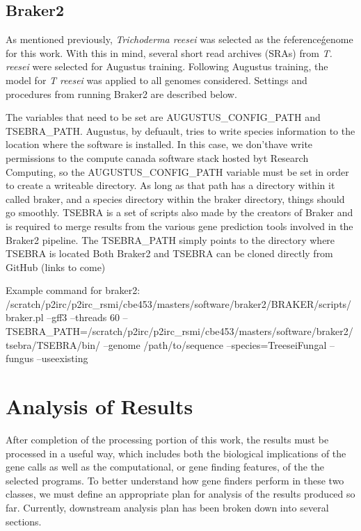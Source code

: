 \documentclass[12pt]{article}
\begin{document}
\subsection{Braker2}

As mentioned previously, \textit{Trichoderma reesei} was selected as
the \'reference\' genome for this work. With this in mind, several
short read archives (SRAs) from \textit{T. reesei} were selected for
Augustus training. Following Augustus training, the model for
\textit{T reesei} was applied to all genomes considered. Settings and
procedures from running Braker2 are described below.

The variables that need to be set are AUGUSTUS\_CONFIG\_PATH and
TSEBRA\_PATH. Augustus, by defuault, tries to write species
information to the location where the software is installed. In this
case, we don'thave write permissions to the compute canada software
stack hosted byt Research Computing, so the AUGUSTUS\_CONFIG\_PATH
variable must be set in order to create a writeable directory. As long
as that path has a directory within it called braker, and a species
directory within the braker directory, things should go
smoothly. TSEBRA is a set of scripts also made by the creators of
Braker and is required to merge results from the various gene
prediction tools involved in the Braker2 pipeline. The TSEBRA\_PATH
simply points to the directory where TSEBRA is located Both Braker2
and TSEBRA can be cloned directly from GitHub (links to come)

Example command for braker2:
/scratch/p2irc/p2irc\_rsmi/cbe453/masters/software/braker2/BRAKER/scripts/braker.pl
--gff3 --threads 60
--TSEBRA\_PATH=/scratch/p2irc/p2irc\_rsmi/cbe453/masters/software/braker2/tsebra/TSEBRA/bin/
--genome /path/to/sequence --species=TreeseiFungal --fungus
--useexisting

\section{Analysis of Results}

After completion of the processing portion of this work, the results
must be processed in a useful way, which includes both the biological
implications of the gene calls as well as the computational, or gene
finding features, of the the selected programs. To better understand
how gene finders perform in these two classes, we must define an
appropriate plan for analysis of the results produced so
far. Currently, downstream analysis plan has been broken down into
several sections.
\end{document}
